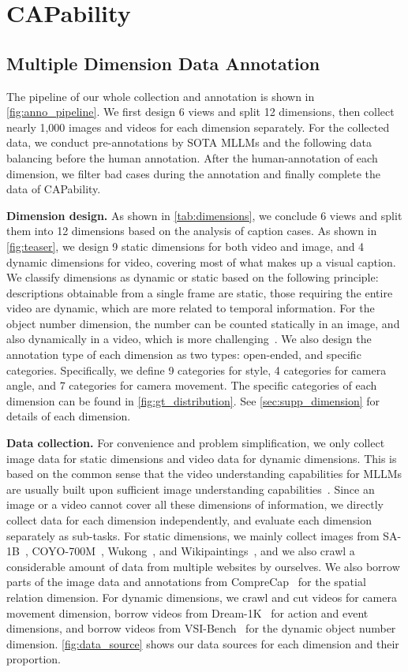 \section{CAPability}
\subsection{Multiple Dimension Data Annotation}
\label{sec:capability_annotation}
The pipeline of our whole collection and annotation is shown in \cref{fig:anno_pipeline}. We first design 6 views and split 12 dimensions, then collect nearly 1,000 images and videos for each dimension separately. For the collected data, we conduct pre-annotations by SOTA MLLMs and the following data balancing before the human annotation. After the human-annotation of each dimension, we filter bad cases during the annotation and finally complete the data of CAPability.

\noindent\textbf{Dimension design.}
As shown in \cref{tab:dimensions}, we conclude 6 views and split them into 12 dimensions based on the analysis of caption cases. As shown in \cref{fig:teaser}, we design 9 static dimensions for both video and image, and 4 dynamic dimensions for video, covering most of what makes up a visual caption. We classify dimensions as dynamic or static based on the following principle: descriptions obtainable from a single frame are static, those requiring the entire video are dynamic, which are more related to temporal information. For the object number dimension, the number can be counted statically in an image, and also dynamically in a video, which is more challenging~\cite{vsibench}.
We also design the annotation type of each dimension as two types: open-ended, and specific categories. Specifically, we define 9 categories for style, 4 categories for camera angle, and 7 categories for camera movement. The specific categories of each dimension can be found in \cref{fig:gt_distribution}. See \cref{sec:supp_dimension} for details of each dimension.

\noindent\textbf{Data collection.}
For convenience and problem simplification, we only collect image data for static dimensions and video data for dynamic dimensions.
This is based on the common sense that the video understanding capabilities for MLLMs are usually built upon sufficient image understanding capabilities~\cite{llavanextvideo, llavavideo, videollama3, internvl2.5}. 
Since an image or a video cannot cover all these dimensions of information, we directly collect data for each dimension independently, and evaluate each dimension separately as sub-tasks.
For static dimensions, we mainly collect images from SA-1B~\cite{sam}, COYO-700M~\cite{coyo700m}, Wukong~\cite{wukong100m}, and Wikipaintings~\cite{wikipaintings}, and we also crawl a considerable amount of data from multiple websites by ourselves. We also borrow parts of the image data and annotations from CompreCap~\cite{comprecap} for the spatial relation dimension. For dynamic dimensions, we crawl and cut videos for camera movement dimension, borrow videos from Dream-1K~\cite{dream1k} for action and event dimensions, and borrow videos from VSI-Bench~\cite{vsibench} for the dynamic object number dimension. \cref{fig:data_source} shows our data sources for each dimension and their proportion.

